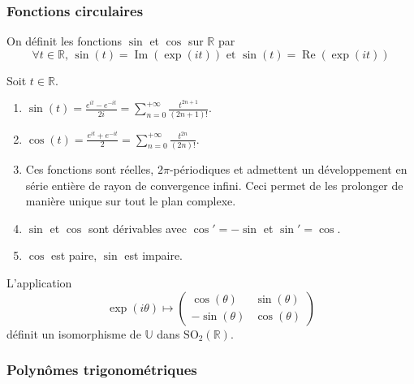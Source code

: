   \subsubsection{Fonctions circulaires}

  \begin{definition}
    On définit les fonctions $\sin$ et $\cos$ sur $\mathbb{R}$ par
    \[ \forall t \in \mathbb{R}, \, \sin(t) = \operatorname{Im}(\exp(it)) \text{ et } \sin(t) = \operatorname{Re}(\exp(it)) \]
  \end{definition}


  \begin{proposition}
    Soit $t \in \mathbb{R}$.
    \begin{enumerate}[label=(\roman*)]
      \item $\sin(t) = \frac{e^{it} - e^{-it}}{2i} = \sum_{n=0}^{+\infty} \frac{t^{2n+1}}{(2n+1)!}$.
      \item $\cos(t) = \frac{e^{it} + e^{-it}}{2} = \sum_{n=0}^{+\infty} \frac{t^{2n}}{(2n)!}$.
      \item Ces fonctions sont réelles, $2\pi$-périodiques et admettent un développement en série entière de rayon de convergence infini. Ceci permet de les prolonger de manière unique sur tout le plan complexe.
      \item $\sin$ et $\cos$ sont dérivables avec $\cos' = -\sin$ et $\sin' = \cos$.
      \item $\cos$ est paire, $\sin$ est impaire.
    \end{enumerate}
  \end{proposition}


  \begin{proposition}
    L'application
    \[ \exp(i\theta) \mapsto
    \begin{pmatrix}
      \cos(\theta) & \sin(\theta) \\
      -\sin(\theta) & \cos(\theta)
    \end{pmatrix}
    \]
    définit un isomorphisme de $\mathbb{U}$ dans $\mathrm{SO}_2(\mathbb{R})$.
  \end{proposition}

  \subsubsection{Polynômes trigonométriques}



